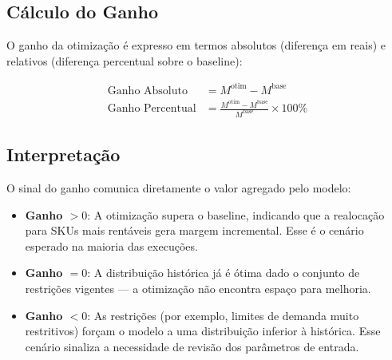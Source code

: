 \documentclass[11pt,a4paper]{article}
\begin{document}
\subsection{Cálculo do Ganho}

O ganho da otimização é expresso em termos absolutos (diferença em reais) e
relativos (diferença percentual sobre o baseline):

\begin{align}\label{eq:auto:al:004}
\text{Ganho Absoluto} &= M^{\text{otim}} - M^{\text{base}} \\[6pt]
\text{Ganho Percentual} &= \frac{M^{\text{otim}} - M^{\text{base}}}{M^{\text{base}}} \times 100\%
\end{align}

\subsection{Interpretação}

O sinal do ganho comunica diretamente o valor agregado pelo modelo:

\begin{itemize}
    \item \textbf{Ganho $> 0$}: A otimização supera o baseline, indicando que a
        realocação para SKUs mais rentáveis gera margem incremental. Esse é o
        cenário esperado na maioria das execuções.
    \item \textbf{Ganho $= 0$}: A distribuição histórica já é ótima dado o
        conjunto de restrições vigentes --- a otimização não encontra espaço
        para melhoria.
    \item \textbf{Ganho $< 0$}: As restrições (por exemplo, limites de demanda
        muito restritivos) forçam o modelo a uma distribuição inferior à
        histórica. Esse cenário sinaliza a necessidade de revisão dos
        parâmetros de entrada.
\end{itemize}



\end{document}

